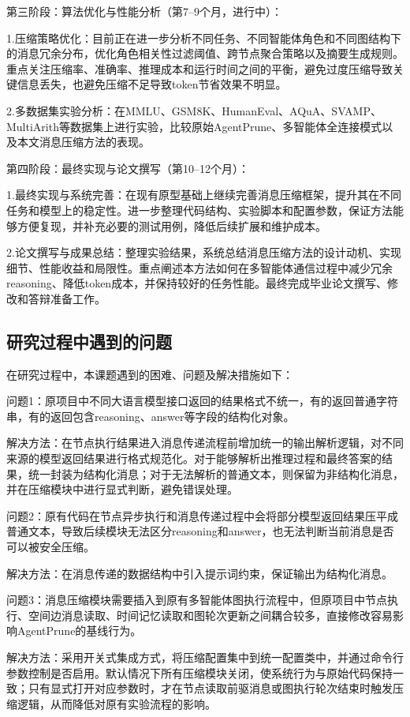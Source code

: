 \documentclass[11pt, a4paper]{article}
\numberwithin{figure}{section}
\begin{document}
第三阶段：算法优化与性能分析（第7--9个月，进行中）：

1.压缩策略优化：目前正在进一步分析不同任务、不同智能体角色和不同图结构下的消息冗余分布，优化角色相关性过滤阈值、跨节点聚合策略以及摘要生成规则。重点关注压缩率、准确率、推理成本和运行时间之间的平衡，避免过度压缩导致关键信息丢失，也避免压缩不足导致token节省效果不明显。

2.多数据集实验分析：在MMLU、GSM8K、HumanEval、AQuA、SVAMP、MultiArith等数据集上进行实验，比较原始AgentPrune、多智能体全连接模式以及本文消息压缩方法的表现。

第四阶段：最终实现与论文撰写（第10--12个月）：

1.最终实现与系统完善：在现有原型基础上继续完善消息压缩框架，提升其在不同任务和模型上的稳定性。进一步整理代码结构、实验脚本和配置参数，保证方法能够方便复现，并补充必要的测试用例，降低后续扩展和维护成本。

2.论文撰写与成果总结：整理实验结果，系统总结消息压缩方法的设计动机、实现细节、性能收益和局限性。重点阐述本方法如何在多智能体通信过程中减少冗余reasoning、降低token成本，并保持较好的任务性能。最终完成毕业论文撰写、修改和答辩准备工作。

\subsection{研究过程中遇到的问题}

在研究过程中，本课题遇到的困难、问题及解决措施如下：

问题1：原项目中不同大语言模型接口返回的结果格式不统一，有的返回普通字符串，有的返回包含reasoning、answer等字段的结构化对象。

解决方法：在节点执行结果进入消息传递流程前增加统一的输出解析逻辑，对不同来源的模型返回结果进行格式规范化。对于能够解析出推理过程和最终答案的结果，统一封装为结构化消息；对于无法解析的普通文本，则保留为非结构化消息，并在压缩模块中进行显式判断，避免错误处理。

问题2：原有代码在节点异步执行和消息传递过程中会将部分模型返回结果压平成普通文本，导致后续模块无法区分reasoning和answer，也无法判断当前消息是否可以被安全压缩。

解决方法：在消息传递的数据结构中引入提示词约束，保证输出为结构化消息。

问题3：消息压缩模块需要插入到原有多智能体图执行流程中，但原项目中节点执行、空间边消息读取、时间记忆读取和图轮次更新之间耦合较多，直接修改容易影响AgentPrune的基线行为。

解决方法：采用开关式集成方式，将压缩配置集中到统一配置类中，并通过命令行参数控制是否启用。默认情况下所有压缩模块关闭，使系统行为与原始代码保持一致；只有显式打开对应参数时，才在节点读取前驱消息或图执行轮次结束时触发压缩逻辑，从而降低对原有实验流程的影响。
\end{document}
